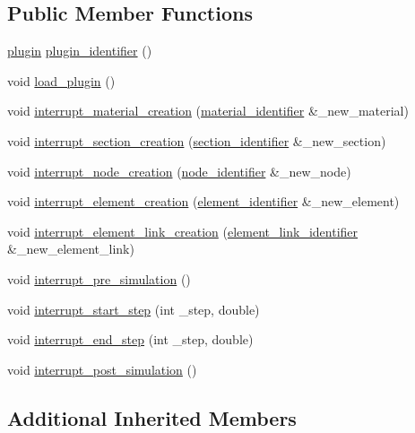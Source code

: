 \subsection*{Public Member Functions}
\begin{DoxyCompactItemize}
\item 
\hyperlink{plugins_8hh_af34747f68f9b0963dea6e8f3c659659c}{plugin} \hyperlink{classExample_aaa8ffc33c65da38507a78ff0558b9a0b}{plugin\-\_\-identifier} ()
\item 
void \hyperlink{classExample_ad360c0096bec1dcc3ee3476177922b9b}{load\-\_\-plugin} ()
\item 
void \hyperlink{classExample_a56e02424701a4ece2cdaf1d78e26e1ee}{interrupt\-\_\-material\-\_\-creation} (\hyperlink{structmaterial__identifier}{material\-\_\-identifier} \&\-\_\-new\-\_\-material)
\item 
void \hyperlink{classExample_a3869ba072c8487da1c2b6bbc329780b7}{interrupt\-\_\-section\-\_\-creation} (\hyperlink{structsection__identifier}{section\-\_\-identifier} \&\-\_\-new\-\_\-section)
\item 
void \hyperlink{classExample_a9f27f6e717db44baf27a1ed29584037a}{interrupt\-\_\-node\-\_\-creation} (\hyperlink{structnode__identifier}{node\-\_\-identifier} \&\-\_\-new\-\_\-node)
\item 
void \hyperlink{classExample_a2faa03f186d79fd113db8101e46b6b47}{interrupt\-\_\-element\-\_\-creation} (\hyperlink{structelement__identifier}{element\-\_\-identifier} \&\-\_\-new\-\_\-element)
\item 
void \hyperlink{classExample_a89228b638604306864d5544808edd94d}{interrupt\-\_\-element\-\_\-link\-\_\-creation} (\hyperlink{structelement__link__identifier}{element\-\_\-link\-\_\-identifier} \&\-\_\-new\-\_\-element\-\_\-link)
\item 
void \hyperlink{classExample_a2cdb7dc01165c9816dcbf5694fa741ff}{interrupt\-\_\-pre\-\_\-simulation} ()
\item 
void \hyperlink{classExample_aea2b516017d673a4c3e1d6c92aa06f8a}{interrupt\-\_\-start\-\_\-step} (int \-\_\-step, double)
\item 
void \hyperlink{classExample_ada33e15e3a0e4ff7cfc3c1cfad26a7bf}{interrupt\-\_\-end\-\_\-step} (int \-\_\-step, double)
\item 
void \hyperlink{classExample_a3835b961774e2cd2eeae6af3e325b4be}{interrupt\-\_\-post\-\_\-simulation} ()
\end{DoxyCompactItemize}
\subsection*{Additional Inherited Members}


